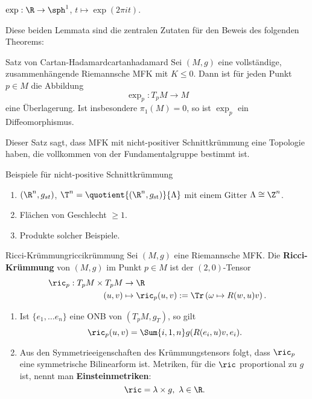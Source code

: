 \begin{beispiel}
$\exp:\R \to \sph^1$, $t \mapsto \exp(2\pi i t)$.
\end{beispiel}
Diese beiden Lemmata sind die zentralen Zutaten für den Beweis des folgenden Theorems:
\begin{theorem}{Satz von Cartan-Hadamard}{cartanhadamard}
Sei $(M,g)$ eine vollständige, zusammenhängende Riemannsche MFK mit $K\leq 0$. Dann ist für jeden Punkt $p \in M$ die Abbildung
\begin{equation}
\exp_p: T_pM \to M
\end{equation}
eine Überlagerung. Ist insbesondere $\pi_1(M)=0$, so ist $\exp_p$ ein Diffeomorphismus.
\end{theorem}
Dieser Satz sagt, dass MFK mit nicht-positiver Schnittkrümmung eine Topologie haben, die vollkommen von der Fundamentalgruppe bestimmt ist.
\begin{beispiele}Beispiele für nicht-positive Schnittkrümmung\\
\begin{enumerate}
\item $(\R^n, g_{st})$, $\T^n = \quotient{(\R^n, g_\text{st})}{\Lambda}$ mit einem Gitter $\Lambda \cong \Z^n$.
\item Flächen von Geschlecht $\geq 1$.
\item Produkte solcher Beispiele.
\end{enumerate}
\end{beispiele}
\begin{definition}{Ricci-Krümmung}{riccikrümmung}
Sei $(M,g)$ eine Riemannsche MFK. Die \textbf{Ricci-Krümmung} von $(M,g)$ im Punkt $p \in M$ ist der $(2,0)$-Tensor 
\begin{align}
\ric_p: T_p M \times T_pM &\to \R \\
(u,v) &\mapsto \ric_p(u,v):=\Tr \left(  \omega \mapsto R(w,u)v \right).
\end{align}
\end{definition}
\begin{bemerkungen}
\begin{enumerate}
\item Ist $\{ e_1, \dots e_n \}$ eine ONB von $(T_pM, g_T)$, so gilt
\begin{equation}
\ric_p(u,v) = \Sum{i,1,n} g(R(e_i,u)v, e_i).
\end{equation}
\item Aus den Symmetrieeigenschaften des Krümmungstensors folgt, dass $\ric_p$ eine symmetrische Bilinearform ist. Metriken, für die $\ric$ proportional zu $g$ ist, nennt man \textbf{Einsteinmetriken}:
\begin{equation}
\ric = \lambda \times g, \ \lambda \in \R.
\end{equation}
\end{enumerate}
\end{bemerkungen}
